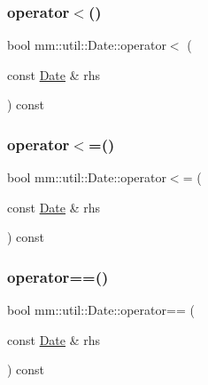\subsubsection{\texorpdfstring{operator$<$()}{operator<()}}
{\footnotesize\ttfamily bool mm\+::util\+::\+Date\+::operator$<$ (\begin{DoxyParamCaption}\item[{const \hyperlink{structmm_1_1util_1_1_date}{Date} \&}]{rhs }\end{DoxyParamCaption}) const}

\mbox{\label{structmm_1_1util_1_1_date_aec9077b20de935d88cc03e4c454915a3}} 
\subsubsection{\texorpdfstring{operator$<$=()}{operator<=()}}
{\footnotesize\ttfamily bool mm\+::util\+::\+Date\+::operator$<$= (\begin{DoxyParamCaption}\item[{const \hyperlink{structmm_1_1util_1_1_date}{Date} \&}]{rhs }\end{DoxyParamCaption}) const}

\mbox{\label{structmm_1_1util_1_1_date_a55071cbbf31cd8956cd4a7d5116e0d95}} 
\subsubsection{\texorpdfstring{operator==()}{operator==()}}
{\footnotesize\ttfamily bool mm\+::util\+::\+Date\+::operator== (\begin{DoxyParamCaption}\item[{const \hyperlink{structmm_1_1util_1_1_date}{Date} \&}]{rhs }\end{DoxyParamCaption}) const}

\mbox{\label{structmm_1_1util_1_1_date_a5b070fd2cd4a72cf74849abd9244b6d3}} 
